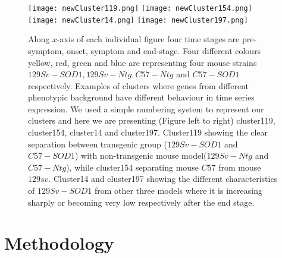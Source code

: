 \begin{figure}
 \begin{center}
 \texttt{[image: newCluster119.png]}
 \texttt{[image: newCluster154.png]}
 \texttt{[image: newCluster14.png]}
 \texttt{[image: newCluster197.png]}
\caption [Few examples of clusters with different dynamics]
{Along $x$-axis of each individual figure four time stages are pre-symptom, onset, 
symptom and end-stage. Four different colours yellow, red, green and blue are representing 
four mouse strains $129Sv-SOD1, 129Sv-Ntg, C57-Ntg$ and $C57-SOD1$ respectively.
Examples of clusters where genes from different phenotypic background have
different behaviour in time series expression. We used a simple numbering system to represent our 
clusters and here we are presenting (Figure left to  right) cluster119, cluster154, cluster14 
and cluster197. Cluster119 showing the clear separation between transgenic group 
($129Sv-SOD1$ and $C57-SOD1$) with non-transgenic mouse model($129Sv-Ntg$ and $C57-Ntg$), 
while cluster154 separating mouse $C57$ from mouse $129sv$. Cluster14 and cluster197 showing 
the different characteristics of $129Sv-SOD1$ from other three models where it is increasing 
sharply or becoming very low respectively after the end stage. \label{fig:fourSampleClusters}}
 \end{center}
\end{figure}



\section{Methodology}

